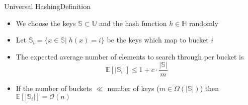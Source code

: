 
\begin{frame}{Universal Hashing}{Definition}
  \begin{itemize}
    \item
      We choose the keys $\mathbb{S} \subset \mathbb{U}$ and the
      hash function $h \in \mathbb{H}$ randomly
    \item
      Let $\mathbb{S}_i = \{x \in \mathbb{S} | \; h(x) = i\}$ be the 
      keys which
      map to bucket $i$
    \item
      The expected average number of elements to search through per 
      bucket is
      \[\mathbb{E}\left[\vert \mathbb{S}_i \vert\right]
        \leq 1 + c \cdot \frac{\vert \mathbb{S} \vert}{m}\]
    \item
      If the number of buckets $\ll$ number of keys
      ($m \in \Omega(\vert \mathbb{S} \vert)$) then
      $\mathbb{E}\left[\vert \mathbb{S}_i \vert\right] = \mathcal{O}(n)$
  \end{itemize}
\end{frame}
